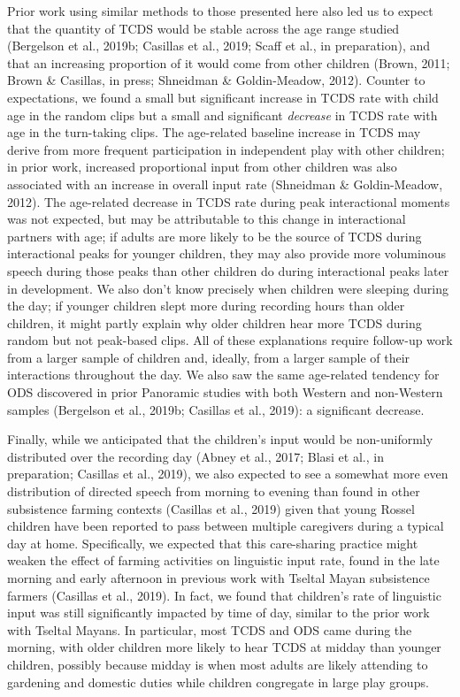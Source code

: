 \documentclass[,man,mask,floatsintext]{apa6}
\begin{document}
Prior work using similar methods to those presented here also led us to
expect that the quantity of TCDS would be stable across the age range
studied (Bergelson et al., 2019b; Casillas et al., 2019; Scaff et al.,
in preparation), and that an increasing proportion of it would come from
other children (Brown, 2011; Brown \& Casillas, in press; Shneidman \&
Goldin-Meadow, 2012). Counter to expectations, we found a small but
significant increase in TCDS rate with child age in the random clips but
a small and significant \emph{decrease} in TCDS rate with age in the
turn-taking clips. The age-related baseline increase in TCDS may derive
from more frequent participation in independent play with other
children; in prior work, increased proportional input from other
children was also associated with an increase in overall input rate
(Shneidman \& Goldin-Meadow, 2012). The age-related decrease in TCDS
rate during peak interactional moments was not expected, but may be
attributable to this change in interactional partners with age; if
adults are more likely to be the source of TCDS during interactional
peaks for younger children, they may also provide more voluminous speech
during those peaks than other children do during interactional peaks
later in development. We also don't know precisely when children were
sleeping during the day; if younger children slept more during recording
hours than older children, it might partly explain why older children
hear more TCDS during random but not peak-based clips. All of these
explanations require follow-up work from a larger sample of children
and, ideally, from a larger sample of their interactions throughout the
day. We also saw the same age-related tendency for ODS discovered in
prior Panoramic studies with both Western and non-Western samples
(Bergelson et al., 2019b; Casillas et al., 2019): a significant
decrease.

Finally, while we anticipated that the children's input would be
non-uniformly distributed over the recording day (Abney et al., 2017;
Blasi et al., in preparation; Casillas et al., 2019), we also expected
to see a somewhat more even distribution of directed speech from morning
to evening than found in other subsistence farming contexts (Casillas et
al., 2019) given that young Rossel children have been reported to pass
between multiple caregivers during a typical day at home. Specifically,
we expected that this care-sharing practice might weaken the effect of
farming activities on linguistic input rate, found in the late morning
and early afternoon in previous work with Tseltal Mayan subsistence
farmers (Casillas et al., 2019). In fact, we found that children's rate
of linguistic input was still significantly impacted by time of day,
similar to the prior work with Tseltal Mayans. In particular, most TCDS
and ODS came during the morning, with older children more likely to hear
TCDS at midday than younger children, possibly because midday is when
most adults are likely attending to gardening and domestic duties while
children congregate in large play groups.
\end{document}
